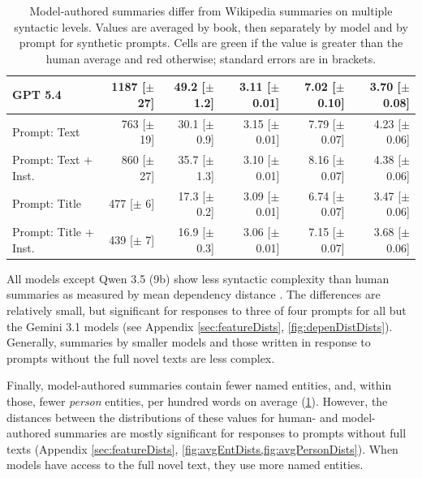 \documentclass{article} %
\begin{document}
\begin{table}
\begin{tabular}{lrrrrr}
    GPT 5.4 & \cellcolor{palegreen}1187 [$\pm$ 27] & \cellcolor{palegreen}49.2 [$\pm$ 1.2] & \cellcolor{palered}3.11 [$\pm$ 0.01] & \cellcolor{palered}7.02 [$\pm$ 0.10] & \cellcolor{palered}3.70 [$\pm$ 0.08] \\
    \midrule
    Prompt: Text & \cellcolor{palered}763 [$\pm$ 19] & \cellcolor{palered}30.1 [$\pm$ 0.9] & \cellcolor{palered}3.15 [$\pm$ 0.01] & \cellcolor{palered}7.79 [$\pm$ 0.07] & \cellcolor{palered}4.23 [$\pm$ 0.06] \\
    Prompt: Text + Inst. & \cellcolor{palered}860 [$\pm$ 27] & \cellcolor{palered}35.7 [$\pm$ 1.3] & \cellcolor{palered}3.10 [$\pm$ 0.01] & \cellcolor{palered}8.16 [$\pm$ 0.07] & \cellcolor{palered}4.38 [$\pm$ 0.06] \\
    Prompt: Title & \cellcolor{palered}477 [$\pm$ 6] & \cellcolor{palered}17.3 [$\pm$ 0.2] & \cellcolor{palered}3.09 [$\pm$ 0.01] & \cellcolor{palered}6.74 [$\pm$ 0.07] & \cellcolor{palered}3.47 [$\pm$ 0.06] \\
    Prompt: Title + Inst. & \cellcolor{palered}439 [$\pm$ 7] & \cellcolor{palered}16.9 [$\pm$ 0.3] & \cellcolor{palered}3.06 [$\pm$ 0.01] & \cellcolor{palered}7.15 [$\pm$ 0.07] & \cellcolor{palered}3.68 [$\pm$ 0.06] \\
    \bottomrule
  \end{tabular}
  \caption{Model-authored summaries differ from Wikipedia summaries on multiple syntactic levels. Values are averaged by book, then separately by model and by prompt for synthetic prompts. Cells are green if the value is greater than the human average and red otherwise; standard errors are in brackets.}
  \label{tab:sumData}
  \vspace{-10pt}
\end{table}

All models except Qwen 3.5 (9b) show less syntactic complexity than human summaries as measured by mean dependency distance \citep{liu2008dependency}. The differences are relatively small, but significant for responses to three of four prompts for all but the Gemini 3.1 models (see Appendix \ref{sec:featureDists}, \cref{fig:depenDistDists}). Generally, summaries by smaller models and those written in response to prompts without the full novel texts are less complex.

Finally, model-authored summaries contain fewer named entities, and, within those, fewer \textit{person} entities, per hundred words on average (\cref{tab:sumData}). However, the distances between the distributions of these values for human- and model-authored summaries are mostly significant for responses to prompts without full texts (Appendix \ref{sec:featureDists}, \cref{fig:avgEntDists,fig:avgPersonDists}). When models have access to the full novel text, they use more named entities.
\end{document}
